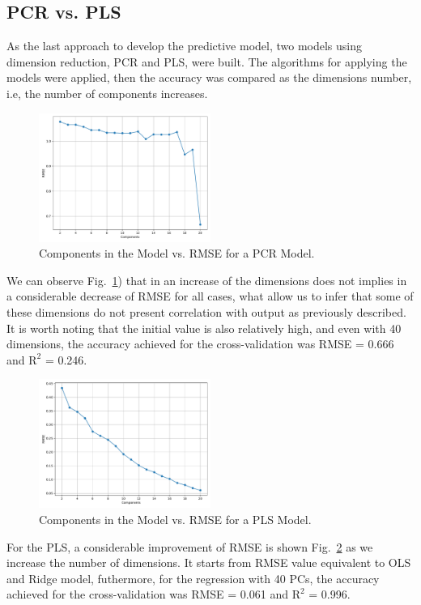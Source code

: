 \subsection{PCR vs. PLS}

As the last approach to develop the predictive model, two models using dimension reduction, PCR and PLS, were built. The algorithms for applying the models were applied, then the accuracy was compared as the dimensions number, i.e, the number of components increases.

\begin{figure}[htbp!]
  \centerline{\includegraphics[width=0.5\textwidth]{../../code/hw2/figures/5-PCR-RMSE.pdf}}
  \caption{Components in the Model vs. RMSE for a PCR Model.}
  \label{fig:5-PCR-RMSE}
\end{figure}

We can observe Fig.~\ref{fig:5-PCR-RMSE}) that in an increase of the dimensions does not implies in a considerable decrease of RMSE for all cases, what allow us to infer that some of these dimensions do not present correlation with output as previously described. It is worth noting that the initial value is also relatively high, and even with 40 dimensions, the accuracy achieved for the cross-validation was RMSE = 0.666 and $\text{R}^2$ = 0.246.

\begin{figure}[htbp!]
  \centerline{\includegraphics[width=0.5\textwidth]{../../code/hw2/figures/5-PLS-RMSE.pdf}}
  \caption{Components in the Model vs. RMSE for a PLS Model.}
  \label{fig:5-PLS-RMSE}
\end{figure}

For the PLS, a considerable improvement of RMSE is shown Fig.~\ref{fig:5-PLS-RMSE} as we increase the number of dimensions. It starts from RMSE value equivalent to OLS and Ridge model, futhermore, for the regression with 40 PCs, the accuracy achieved for the cross-validation was RMSE = 0.061 and $\text{R}^2$ = 0.996.
